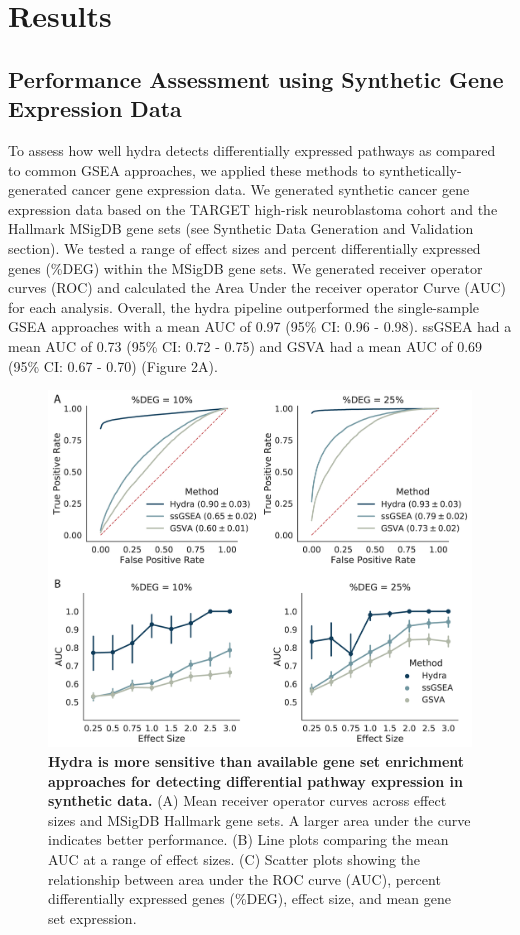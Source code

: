 \documentclass[10pt,letterpaper]{article}
\begin{document}
\section*{Results}
\subsection{Performance Assessment using Synthetic Gene Expression Data}
To assess how well hydra detects differentially expressed pathways as compared to common GSEA approaches, we applied these methods to synthetically-generated cancer gene expression data. We generated synthetic cancer gene expression data based on the TARGET high-risk neuroblastoma cohort and the Hallmark MSigDB gene sets (see Synthetic Data Generation and Validation section). We tested a range of effect sizes and percent differentially expressed genes (\%DEG) within the MSigDB gene sets. We generated receiver operator curves (ROC) and calculated the Area Under the receiver operator Curve (AUC) for each analysis. Overall, the hydra pipeline outperformed the single-sample GSEA approaches with a mean AUC of 0.97 (95\% CI: 0.96 - 0.98). ssGSEA had a mean AUC of 0.73 (95\% CI: 0.72 - 0.75) and GSVA had a mean AUC of 0.69 (95\% CI: 0.67 - 0.70) (Figure 2A).

\begin{figure}[!h]
	\includegraphics[width=\textwidth]{img/ROC-PLOT-2x}
	\caption{{\bf Hydra is more sensitive than available gene set enrichment approaches for detecting differential pathway expression in synthetic data.}
		(A) Mean receiver operator curves across effect sizes and MSigDB Hallmark gene sets. A larger area under the curve indicates better performance. (B) Line plots comparing the mean AUC at a range of effect sizes. (C) Scatter plots showing the relationship between area under the ROC curve (AUC), percent differentially expressed genes (\%DEG), effect size, and mean gene set expression.
		\label{rocplot}}
\end{figure}
\end{document}
